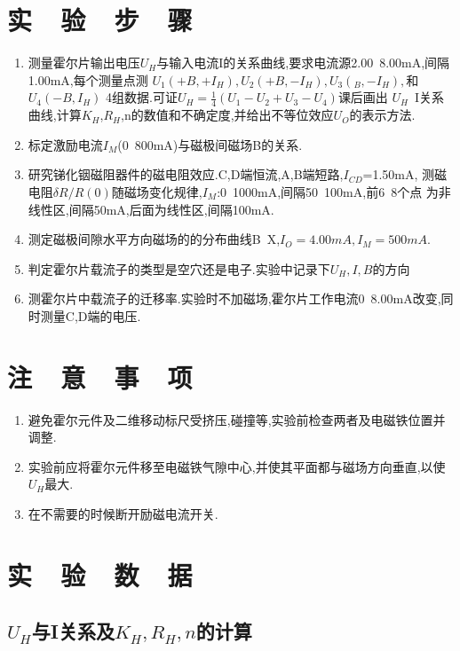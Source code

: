 \documentclass{thuemp}
\begin{document}
\section{实~~验~~步~~骤} 
\begin{enumerate}
	\item 测量霍尔片输出电压$U_{H}$与输入电流I的关系曲线,要求电流源2.00~8.00mA,间隔1.00mA,每个测量点测
	$ U_{1}(+B,+I_H{}),U_{2}(+B,-I_{H}),U_{3}(_B,-I_{H}), $和$U_{4}(-B,I_{H})$
	4组数据.可证$U_{H}=\frac{1}{4}(U_{1}-U_{2}+U_{3}-U_{4})$课后画出
	$U_{H}$~I关系曲线,计算$K_{H}$,$R_{H}$,n的数值和不确定度,并给出不等位效应$U_{O}$的表示方法.
	\item 标定激励电流$I_{M}$(0~800mA)与磁极间磁场B的关系.
	\item 研究锑化铟磁阻器件的磁电阻效应.C,D端恒流,A,B端短路,$ I_{CD} $=1.50mA,
	测磁电阻$ \delta R/R(0) $随磁场变化规律,$ I_{M} $:0~1000mA,间隔50~100mA,前6~8个点
	为非线性区,间隔50mA,后面为线性区,间隔100mA.
	\item 测定磁极间隙水平方向磁场的的分布曲线B~X,$ I_{O}=4.00mA,I_{M}=500mA $.
	\item 判定霍尔片载流子的类型是空穴还是电子.实验中记录下$ U_{H},I,B $的方向
	\item 测霍尔片中载流子的迁移率.实验时不加磁场,霍尔片工作电流0~8.00mA改变,同时测量C,D端的电压.
\end{enumerate}
\section{注~~意~~事~~项}
\begin{enumerate} 
	\item 避免霍尔元件及二维移动标尺受挤压,碰撞等,实验前检查两者及电磁铁位置并调整.
	\item 实验前应将霍尔元件移至电磁铁气隙中心,并使其平面都与磁场方向垂直,以使$U_{H}$最大.
	\item 在不需要的时候断开励磁电流开关.
\end{enumerate}
\section{实~~验~~数~~据}

\subsection{$U_{H}$与I关系及$K_{H},R_{H},n$的计算}
\end{document}
